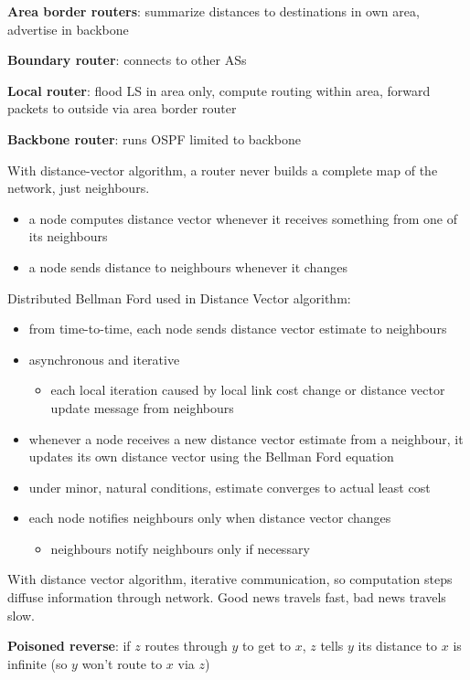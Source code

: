 \documentclass[11pt]{article}
\begin{document}
\textbf{Area border routers}: summarize distances to destinations in own area, advertise in backbone

\textbf{Boundary router}: connects to other ASs

\textbf{Local router}: flood LS in area only, compute routing within area, forward packets to outside via
area border router

\textbf{Backbone router}: runs OSPF limited to backbone

With distance-vector algorithm, a router never builds a complete map of the network, just
neighbours.
\begin{itemize}
\item a node computes distance vector whenever it receives something from one of its neighbours
\item a node sends distance to neighbours whenever it changes
\end{itemize}

Distributed Bellman Ford used in Distance Vector algorithm:
\begin{itemize}
\item from time-to-time, each node sends distance vector estimate to neighbours
\item asynchronous and iterative
\begin{itemize}
\item each local iteration caused by local link cost change or distance vector update message from
neighbours
\end{itemize}
\item whenever a node receives a new distance vector estimate from a neighbour, it updates its own
distance vector using the Bellman Ford equation
\item under minor, natural conditions, estimate converges to actual least cost
\item each node notifies neighbours only when distance vector changes
\begin{itemize}
\item neighbours notify neighbours only if necessary
\end{itemize}
\end{itemize}

With distance vector algorithm, iterative communication, so computation steps diffuse information
through network.
Good news travels fast, bad news travels slow.

\textbf{Poisoned reverse}: if \(z\) routes through \(y\) to get to \(x\), \(z\) tells \(y\) its distance to \(x\) is
infinite (so \(y\) won't route to \(x\) via \(z\))
\end{document}
